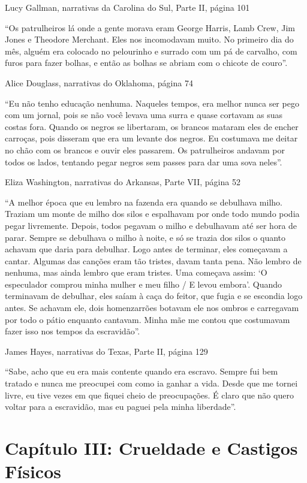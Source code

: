 Lucy Gallman, narrativas da Carolina do Sul, Parte II, página 101

``Os patrulheiros lá onde a gente morava eram George Harris, Lamb Crew,
Jim Jones e Theodore Merchant. Eles nos incomodavam muito. No primeiro
dia do mês, alguém era colocado no pelourinho e surrado com um pá de
carvalho, com furos para fazer bolhas, e então as bolhas se abriam com o
chicote de couro''.

Alice Douglass, narrativas do Oklahoma, página 74

``Eu não tenho educação nenhuma. Naqueles tempos, era melhor nunca ser
pego com um jornal, pois se não você levava uma surra e quase cortavam
as suas costas fora. Quando os negros se libertaram, os brancos mataram
eles de encher carroças, pois disseram que era um levante dos negros. Eu
costumava me deitar no chão com os brancos e ouvir eles passarem. Os
patrulheiros andavam por todos os lados, tentando pegar negros sem
passes para dar uma sova neles''.

Eliza Washington, narrativas do Arkansas, Parte VII, página 52

``A melhor época que eu lembro na fazenda era quando se debulhava milho.
Traziam um monte de milho dos silos e espalhavam por onde todo mundo
podia pegar livremente. Depois, todos pegavam o milho e debulhavam até
ser hora de parar. Sempre se debulhava o milho à noite, e só se trazia
dos silos o quanto achavam que daria para debulhar. Logo antes de
terminar, eles começavam a cantar. Algumas das canções eram tão tristes,
davam tanta pena. Não lembro de nenhuma, mas ainda lembro que eram
tristes. Uma começava assim: `O especulador comprou minha mulher e meu
filho / E levou embora'. Quando terminavam de debulhar, eles saíam à
caça do feitor, que fugia e se escondia logo antes. Se achavam ele, dois
homenzarrões botavam ele nos ombros e carregavam por todo o pátio
enquanto cantavam. Minha mãe me contou que costumavam fazer isso nos
tempos da escravidão''.

James Hayes, narrativas do Texas, Parte II, página 129

``Sabe, acho que eu era mais contente quando era escravo. Sempre fui bem
tratado e nunca me preocupei com como ia ganhar a vida. Desde que me
tornei livre, eu tive vezes em que fiquei cheio de preocupações. É claro
que não quero voltar para a escravidão, mas eu paguei pela minha
liberdade''.

\chapter{Capítulo III: Crueldade e Castigos Físicos}

